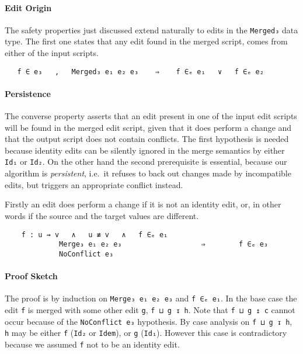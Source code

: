 \documentclass[preprint]{sigplanconf}
\begin{document}
    \paragraph{Edit Origin}
    The safety properties just discussed extend naturally to edits in the 
    \texttt{Merged₃} data type.
    The first one states that any edit found in the merged script,
    comes from either of the input scripts.
\begin{verbatim}
   f ∈ e₃   ,   Merged₃ e₁ e₂ e₃    ⇒    f ∈ₑ e₁   ∨   f ∈ₑ e₂
\end{verbatim}
    
    \paragraph{Persistence}
    The converse property asserts that an edit present in one of the input
    edit scripts will be found in the merged edit script, given that it does
    perform a change and that the output script does not contain conflicts.
    The first hypothesis is needed because identity edits can be silently 
    ignored in the merge semantics by either \texttt{Id₁} or
    \texttt{Id₂}.
    On the other hand the second prerequisite is essential, because 
    our algorithm is \emph{persistent}, i.e.\ it refuses to back out changes 
    made by incompatible edits, but triggers an appropriate conflict instead.

    Firstly an edit does perform a change if it is not an identity edit, or, in 
    other words if the source and the target values are different.
				
\begin{verbatim}
    f : u ⇝ v   ∧   u ≢ v   ∧   f ∈ₑ e₁
             Merge₃ e₁ e₂ e₃                   ⇒        f ∈ₑ e₃
             NoConflict e₃ 
\end{verbatim}
    \paragraph{Proof Sketch}
    The proof is by induction on \texttt{Merge₃ e₁ e₂ e₃} and \texttt{f ∈ₑ e₁}.
    In the base case the edit \texttt{f} is merged with some other edit \texttt{g},
    \texttt{f ⊔ g ↧ h}. Note that \texttt{f ⊔ g ↥ c} cannot occur because of
    the \texttt{NoConflict e₃} hypothesis. By case analysis on \texttt{f ⊔ g ↧ h},
    \texttt{h} may be either \texttt{f} (\texttt{Id₂} or \texttt{Idem}), or 
    \texttt{g} (\texttt{Id₁}). However this case is contradictory because we
    assumed \texttt{f} not to be an identity edit.
    
\end{document}
